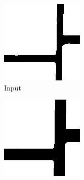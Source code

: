 \documentclass[serif,article,noparskip]{agse-thesis}
\begin{document}
\begin{figure}
\centering
\begin{subfigure}{.3\textwidth}
  \centering
  \includegraphics[width=\linewidth]{images/example.jpg}
  \caption{Input}
  \label{fig:input}
\end{subfigure}%
\begin{subfigure}{.3\textwidth}
  \centering
  \includegraphics[width=\linewidth]{images/example-erode.jpg}

\end{subfigure}
\end{figure}
\end{document}
